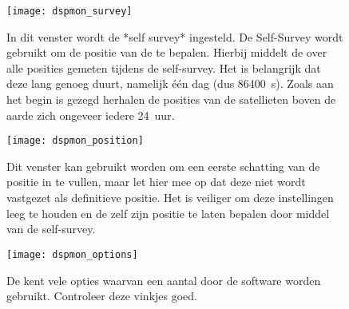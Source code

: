 \begin{figure}
    \centering
    \texttt{[image: dspmon\_survey]}
    \caption{In dit venster wordt de *self survey* ingesteld. De
    Self-Survey wordt gebruikt om de positie van de \gps te bepalen.
    Hierbij middelt de \gps over alle posities gemeten tijdens de
    self-survey. Het is belangrijk dat deze lang genoeg duurt, namelijk
    één dag (dus \SI{86400}{\second}). Zoals aan het begin is gezegd
    herhalen de posities van de \gps satellieten boven de aarde zich
    ongeveer iedere \SI{24}{uur}.}
    \label{fig:dspmon_survey}
\end{figure}
   
\begin{figure}
    \centering
    \texttt{[image: dspmon\_position]}
    \caption{Dit venster kan gebruikt worden om een eerste schatting van
    de positie in te vullen, maar let hier mee op dat deze niet wordt
    vastgezet als definitieve positie. Het is veiliger om deze
    instellingen leeg te houden en de \gps zelf zijn positie te laten
    bepalen door middel van de self-survey.}
    \label{fig:dspmon_position}
\end{figure}

\begin{figure}
    \centering
    \texttt{[image: dspmon\_options]}
    \caption{De \gps kent vele opties waarvan een aantal door de \hisparc
    software worden gebruikt. Controleer deze vinkjes goed.}
    \label{fig:dspmon_options}
\end{figure}




